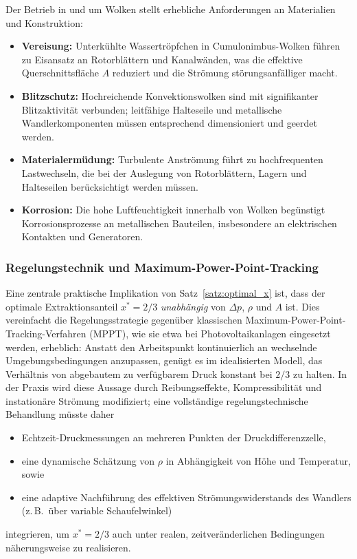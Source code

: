 ﻿\documentclass[a4paper,12pt]{article}
\theoremstyle{definition}
\begin{document}
Der Betrieb in und um Wolken stellt erhebliche Anforderungen an Materialien
und Konstruktion:

\begin{itemize}
	\item \textbf{Vereisung:} Unterkühlte Wassertröpfchen in
	Cumulonimbus-Wolken führen zu Eisansatz an Rotorblättern und
	Kanalwänden, was die effektive Querschnittsfläche $A$ reduziert und
	die Strömung störungsanfälliger macht.
	\item \textbf{Blitzschutz:} Hochreichende Konvektionswolken sind mit
	signifikanter Blitzaktivität verbunden; leitfähige Halteseile und
	metallische Wandlerkomponenten müssen entsprechend dimensioniert und
	geerdet werden.
	\item \textbf{Materialermüdung:} Turbulente Anströmung führt zu
	hochfrequenten Lastwechseln, die bei der Auslegung von Rotorblättern,
	Lagern und Halteseilen berücksichtigt werden müssen.
	\item \textbf{Korrosion:} Die hohe Luftfeuchtigkeit innerhalb von
	Wolken begünstigt Korrosionsprozesse an metallischen Bauteilen,
	insbesondere an elektrischen Kontakten und Generatoren.
\end{itemize}

\subsubsection{Regelungstechnik und Maximum-Power-Point-Tracking}

Eine zentrale praktische Implikation von Satz~\ref{satz:optimal_x} ist,
dass der optimale Extraktionsanteil $x^\ast = 2/3$ \emph{unabhängig} von
$\Delta p$, $\rho$ und $A$ ist. Dies vereinfacht die Regelungsstrategie
gegenüber klassischen Maximum-Power-Point-Tracking-Verfahren (MPPT), wie
sie etwa bei Photovoltaikanlagen eingesetzt werden, erheblich: Anstatt den
Arbeitspunkt kontinuierlich an wechselnde Umgebungsbedingungen anzupassen,
genügt es im idealisierten Modell, das Verhältnis von abgebautem zu
verfügbarem Druck konstant bei $2/3$ zu halten. In der Praxis wird diese
Aussage durch Reibungseffekte, Kompressibilität und instationäre Strömung
modifiziert; eine vollständige regelungstechnische Behandlung müsste
daher
\begin{itemize}
	\item Echtzeit-Druckmessungen an mehreren Punkten der
	Druckdifferenzzelle,
	\item eine dynamische Schätzung von $\rho$ in Abhängigkeit von Höhe
	und Temperatur, sowie
	\item eine adaptive Nachführung des effektiven Strömungswiderstands
	des Wandlers (z.\,B.\ über variable Schaufelwinkel)
\end{itemize}
integrieren, um $x^\ast = 2/3$ auch unter realen, zeitveränderlichen
Bedingungen näherungsweise zu realisieren.
\end{document}
